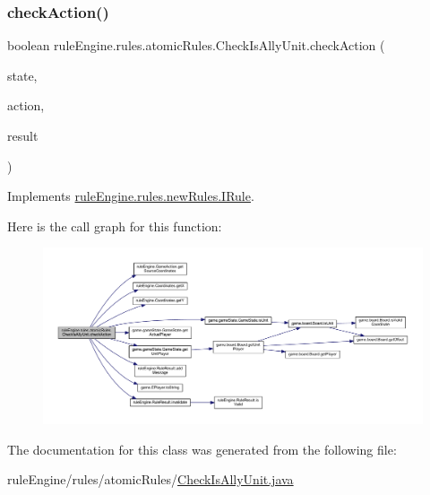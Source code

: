 \subsubsection{\texorpdfstring{check\+Action()}{checkAction()}}
{\footnotesize\ttfamily boolean rule\+Engine.\+rules.\+atomic\+Rules.\+Check\+Is\+Ally\+Unit.\+check\+Action (\begin{DoxyParamCaption}\item[{\mbox{\hyperlink{classgame_1_1game_state_1_1_game_state}{Game\+State}}}]{state,  }\item[{\mbox{\hyperlink{classrule_engine_1_1_game_action}{Game\+Action}}}]{action,  }\item[{\mbox{\hyperlink{classrule_engine_1_1_rule_result}{Rule\+Result}}}]{result }\end{DoxyParamCaption})\hspace{0.3cm}{\ttfamily [inline]}}



Implements \mbox{\hyperlink{interfacerule_engine_1_1rules_1_1new_rules_1_1_i_rule_a72ce29a47d7a5fba75a09444a50a481e}{rule\+Engine.\+rules.\+new\+Rules.\+I\+Rule}}.

Here is the call graph for this function\+:
\nopagebreak
\begin{figure}[H]
\begin{center}
\leavevmode
\includegraphics[width=350pt]{classrule_engine_1_1rules_1_1atomic_rules_1_1_check_is_ally_unit_a961880efbdfdf45e3ad9ecf31dc17cb8_cgraph}
\end{center}
\end{figure}


The documentation for this class was generated from the following file\+:\begin{DoxyCompactItemize}
\item 
rule\+Engine/rules/atomic\+Rules/\mbox{\hyperlink{_check_is_ally_unit_8java}{Check\+Is\+Ally\+Unit.\+java}}\end{DoxyCompactItemize}

